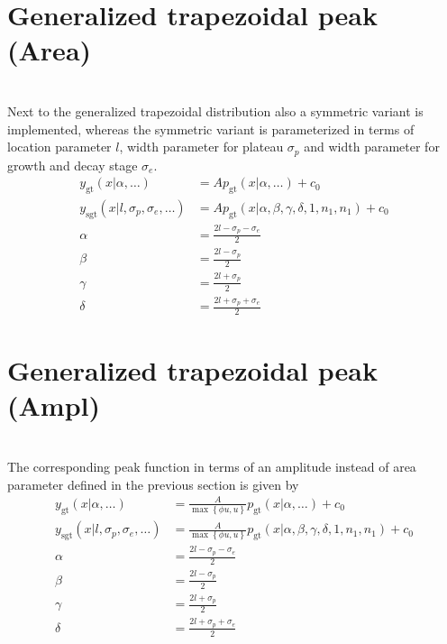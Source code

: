 \section{Generalized trapezoidal peak (Area)} ~\\
\label{sec:generalizedtrapezoidalArea}
Next to the generalized trapezoidal distribution also a symmetric variant is implemented, whereas the symmetric variant is parameterized in terms of location parameter $l$, width parameter for plateau $\sigma_p$ and width parameter for growth and decay stage $\sigma_e$.
\begin{align}\label{eq:generalizedtrapezoidalpeakArea}
y_\mathrm{gt}(x|\alpha,\ldots) &= A\textstyle p_\mathrm{gt}(x|\alpha,\ldots) +c_0 \\
y_\mathrm{sgt}(x|l,\sigma_p,\sigma_e,\ldots) &= A \textstyle p_\mathrm{gt}\left(x|\alpha,\beta,\gamma,\delta,1,n_1,n_1\right) +c_0 \\
\alpha &= \frac{2l-\sigma_p-\sigma_e}{2} \\
\beta  &= \frac{2l-\sigma_p}{2} \\
\gamma &= \frac{2l+\sigma_p}{2} \\
\delta &= \frac{2l+\sigma_p+\sigma_e}{2}
\end{align} 

\section{Generalized trapezoidal peak (Ampl)} ~\\
\label{sec:generalizedtrapezoidalAmpl}
The corresponding peak function in terms of an amplitude instead of area parameter defined in the previous section is given by
\begin{align}\label{eq:generalizedtrapezoidalpeakAmpl}
y_\mathrm{gt}(x|\alpha,\ldots) &= \frac{A}{\max\left\{\phi u,u\right\}}\textstyle p_\mathrm{gt}(x|\alpha,\ldots) +c_0 \\
y_\mathrm{sgt}(x|l,\sigma_p,\sigma_e,\ldots) &= \frac{A}{\max\left\{\phi u,u\right\}} \textstyle p_\mathrm{gt}\left(x|\alpha,\beta,\gamma,\delta,1,n_1,n_1\right) +c_0 \\
\alpha &= \frac{2l-\sigma_p-\sigma_e}{2} \\
\beta  &= \frac{2l-\sigma_p}{2} \\
\gamma &= \frac{2l+\sigma_p}{2} \\
\delta &= \frac{2l+\sigma_p+\sigma_e}{2}
\end{align}

\clearpage
